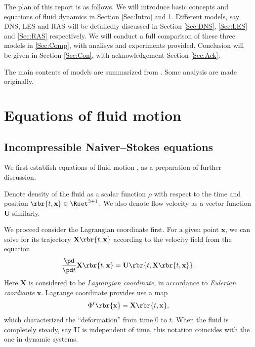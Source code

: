 \documentclass[english, nochinese]{pkupaper}
\begin{document}
The plan of this report is as follows. We will introduce basic concepts and equations of fluid dynamics in Section \ref{Sec:Intro} and \ref{Sec:Eq}. Different models, say DNS, LES and RAS will be detailedly discussed in Section \ref{Sec:DNS}, \ref{Sec:LES} and \ref{Sec:RAS} respectively. We will conduct a full comparison of these three models in \ref{Sec:Comp}, with analisys and experiments provided. Conclusion will be given in Section \ref{Sec:Con}, with acknowledgement Section \ref{Sec:Ack}.

The main contents of models are summarized from \parencite{pope_turbulent_2001} \parencite{zhaoshun_zhang_theory_2005}. Some analysis are made originally.

\section{Equations of fluid motion} \label{Sec:Eq}

\subsection{Incompressible Naiver--Stokes equations}

We first establish equations of fluid motion \parencite{pope_turbulent_2001} \parencite{ferziger_computational_2002}, as a preparation of further discussion.

Denote density of the fluid as a scalar function $\rho$ with respect to the time and position $ \rbr{ t, \mathbf{x} } \in \Rset^{ 3 + 1 } $. We also denote flow velocity as a vector function $\mathbf{U}$ similarly.

We proceed consider the Lagrangian coordinate first. For a given point $\mathbf{x}$, we can solve for its trajectory $ \mathbf{X} \rbr{ t, \mathbf{x} } $ according to the velocity field from the equation
\begin{equation}
\frac{\pd}{ \pd t } \mathbf{X} \rbr{ t, \mathbf{x} } = \mathbf{U} \rbr{ t, \mathbf{X} \rbr{ t, \mathbf{x} } }.
\end{equation}
Here $\mathbf{X}$ is considered to be \emph{Lagrangian coordinate}, in accordance to \emph{Eulerian coordiante} $\mathbf{x}$. Lagrange coordinate provides use a map
\begin{equation}
\Phi^t \rbr{\mathbf{x}} = \mathbf{X} \rbr{ t, \mathbf{x} },
\end{equation}
which characterized the ``deformation'' from time $0$ to $t$. When the fluid is completely steady, say $\mathbf{U}$ is independent of time, this notation coincides with the one in dynamic systems.
\end{document}
